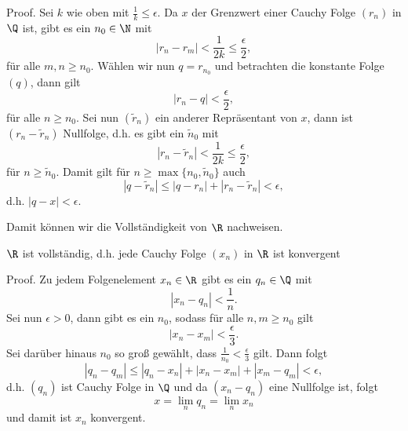 \documentclass[letterpaper,10pt,english]{jupyterBook}
\begin{document}
\begin{emphBox}{}{}
Proof.  Sei \(k\) wie oben mit \(\frac{1}k \leq \epsilon\). Da \(x\) der Grenzwert einer Cauchy Folge \((r_n)\) in \(\Q\) ist, gibt es ein \(n_0 \in \N\) mit
\begin{equation*}
|r_n - r_m| < \frac{1}{2k} \leq \frac{\epsilon}2,
\end{equation*}
für alle \(m,n \geq n_0\). Wählen wir nun \(q=r_{n_0}\) und betrachten die konstante Folge \((q)\), dann gilt
\begin{equation*}
|r_n - q| <  \frac{\epsilon}2,
\end{equation*}
für alle \(n \geq n_0\). Sei nun \((\tilde r_n)\) ein anderer Repräsentant von \(x\), dann ist \((r_n - \tilde r_n)\) Nullfolge, d.h. es gibt ein \(\tilde n_0\) mit
\begin{equation*}
|r_n - \tilde r_n|   < \frac{1}{2k} \leq \frac{\epsilon}2,
\end{equation*}
für \(n \geq \tilde n_0\). Damit gilt für \(n\geq \max\{n_0,\tilde n_0\}\) auch
\begin{equation*}
|q-\tilde r_n| \leq |q -r_n|+|r_n - \tilde r_n| < \epsilon,
\end{equation*}
d.h. \(|q-x| < \epsilon\).
\end{emphBox}

Damit können wir die Vollständigkeit von \(\R\) nachweisen.
\label{grundlagen/zahlensysteme:theorem-24}
\begin{theorem}{}{}



\(\R\) ist vollständig, d.h. jede Cauchy Folge \((x_n)\) in \(\R\) ist konvergent
\end{theorem}

\begin{emphBox}{}{}
Proof.  Zu jedem Folgenelement \(x_n \in \R\) gibt es ein \(q_n \in \Q\) mit
\begin{equation*}
|x_n-q_n| < \frac{1}n.
\end{equation*}
Sei nun \(\epsilon > 0\), dann gibt es ein \(n_0\), sodass für alle \(n,m \geq n_0\) gilt
\begin{equation*}
|x_n - x_m| < \frac{\epsilon}3.
\end{equation*}
Sei darüber hinaus \(n_0\) so groß gewählt, dass \(\frac{1}{n_0} < \frac{\epsilon}3\) gilt. Dann folgt
\begin{equation*}
|q_n - q_m| \leq |q_n - x_n| + |x_n - x_m| + |x_m-q_m| <\epsilon,
\end{equation*}
d.h. \((q_n)\) ist Cauchy Folge in \(\Q\) und da \((x_n -q_n)\) eine Nullfolge ist, folgt
\begin{equation*}
 x=\lim_n q_n = \lim_n x_n
\end{equation*}
und damit ist \(x_n\) konvergent.
\end{emphBox}
\end{document}
